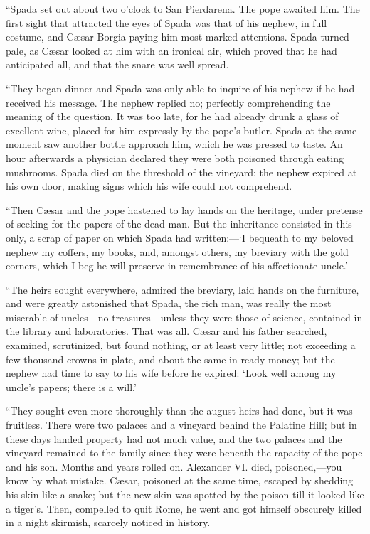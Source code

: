 “Spada set out about two o’clock to San Pierdarena. The pope awaited
him. The first sight that attracted the eyes of Spada was that of his
nephew, in full costume, and Cæsar Borgia paying him most marked
attentions. Spada turned pale, as Cæsar looked at him with an ironical
air, which proved that he had anticipated all, and that the snare was
well spread.

“They began dinner and Spada was only able to inquire of his nephew if
he had received his message. The nephew replied no; perfectly
comprehending the meaning of the question. It was too late, for he had
already drunk a glass of excellent wine, placed for him expressly by
the pope’s butler. Spada at the same moment saw another bottle approach
him, which he was pressed to taste. An hour afterwards a physician
declared they were both poisoned through eating mushrooms. Spada died
on the threshold of the vineyard; the nephew expired at his own door,
making signs which his wife could not comprehend.

“Then Cæsar and the pope hastened to lay hands on the heritage, under
pretense of seeking for the papers of the dead man. But the inheritance
consisted in this only, a scrap of paper on which Spada had written:—‘I
bequeath to my beloved nephew my coffers, my books, and, amongst
others, my breviary with the gold corners, which I beg he will preserve
in remembrance of his affectionate uncle.’

“The heirs sought everywhere, admired the breviary, laid hands on the
furniture, and were greatly astonished that Spada, the rich man, was
really the most miserable of uncles—no treasures—unless they were those
of science, contained in the library and laboratories. That was all.
Cæsar and his father searched, examined, scrutinized, but found
nothing, or at least very little; not exceeding a few thousand crowns
in plate, and about the same in ready money; but the nephew had time to
say to his wife before he expired: ‘Look well among my uncle’s papers;
there is a will.’

“They sought even more thoroughly than the august heirs had done, but
it was fruitless. There were two palaces and a vineyard behind the
Palatine Hill; but in these days landed property had not much value,
and the two palaces and the vineyard remained to the family since they
were beneath the rapacity of the pope and his son. Months and years
rolled on. Alexander VI. died, poisoned,—you know by what mistake.
Cæsar, poisoned at the same time, escaped by shedding his skin like a
snake; but the new skin was spotted by the poison till it looked like a
tiger’s. Then, compelled to quit Rome, he went and got himself
obscurely killed in a night skirmish, scarcely noticed in history.

